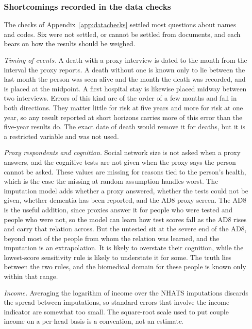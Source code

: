 \subsubsection{Shortcomings recorded in the data checks}

The checks of Appendix~\ref{app:datachecks} settled most questions about names and
codes. Six were not settled, or cannot be settled from documents, and each bears
on how the results should be weighed.

\emph{Timing of events.} A death with a proxy interview is dated to the month from
the interval the proxy reports. A death without one is known only to lie between
the last month the person was seen alive and the month the death was recorded, and
is placed at the midpoint. A first hospital stay is likewise placed midway between
two interviews. Errors of this kind are of the order of a few months and fall in
both directions. They matter little for risk at five years and more for risk at one
year, so any result reported at short horizons carries more of this error than the
five-year results do. The exact date of death would remove it for deaths, but it is
a restricted variable and was not used.

\emph{Proxy respondents and cognition.} Social network size is not asked when a
proxy answers, and the cognitive tests are not given when the proxy says the person
cannot be asked. These values are missing for reasons tied to the person's health,
which is the case the missing-at-random assumption handles worst. The imputation
model adds whether a proxy answered, whether the tests could not be given, whether
dementia has been reported, and the AD8 proxy screen. The AD8 is the useful
addition, since proxies answer it for people who were tested and people who were
not, so the model can learn how test scores fall as the AD8 rises and carry that
relation across. But the untested sit at the severe end of the AD8, beyond most of
the people from whom the relation was learned, and the imputation is an
extrapolation. It is likely to overstate their cognition, while the lowest-score
sensitivity rule is likely to understate it for some. The truth lies between the two
rules, and the biomedical domain for these people is known only within that range.

\emph{Income.} Averaging the logarithm of income over the NHATS imputations
discards the spread between imputations, so standard errors that involve the income
indicator are somewhat too small. The square-root scale used to put couple income
on a per-head basis is a convention, not an estimate.

